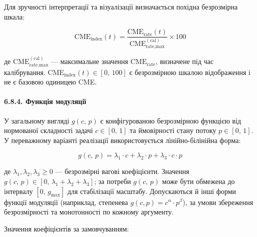 \documentclass[12pt,a4paper]{article}
\begin{document}
Для зручності інтерпретації та візуалізації визначається похідна безрозмірна шкала:



\[\text{CME}_{\text{index}}(t) = \frac{\text{CME}_{\text{rate}}(t)}{\text{CME}_{\text{rate,max}}^{(\text{cal})}} \times 100\]



де \(\text{CME}_{\text{rate,max}}^{(\text{cal})}\) --- максимальне значення \(\text{CME}_{\text{rate}}\), визначене під час калібрування. \(\text{CME}_{\text{index}}(t) \in [0,\,100]\) є безрозмірною шкалою відображення і не є базовою одиницею CME.



\paragraph{6.8.4. Функція модуляції}\label{ux444ux443ux43dux43aux446ux456ux44f-ux43cux43eux434ux443ux43bux44fux446ux456ux457}



У загальному вигляді \(g(c,\,p)\) є конфігурованою безрозмірною функцією від нормованої складності задачі \(c \in [0,\,1]\) та ймовірності стану потоку \(p \in [0,\,1]\). У переважному варіанті реалізації використовується лінійно-білінійна форма:



\[g(c,\,p) = \lambda_1 \cdot c + \lambda_2 \cdot p + \lambda_3 \cdot c \cdot p\]



де \(\lambda_1, \lambda_2, \lambda_3 \geq 0\) --- безрозмірні вагові коефіцієнти. Значення \(g(c,\,p) \in [0,\,\lambda_1 + \lambda_2 + \lambda_3]\); за потреби \(g(c,\,p)\) може бути обмежена до інтервалу \([0,\,g_{\max}]\) для стабілізації масштабу. Допускаються й інші форми функції модуляції (наприклад, степенева \(g(c,p) = c^\alpha \cdot p^\beta\)), за умови збереження безрозмірності та монотонності по кожному аргументу.



Значення коефіцієнтів за замовчуванням:
\end{document}

